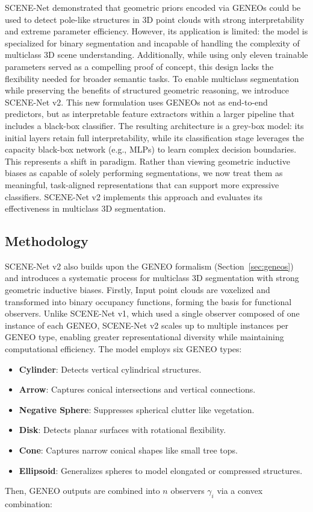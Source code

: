 SCENE-Net demonstrated that geometric priors encoded via GENEOs could be used
to detect pole-like structures in 3D point clouds with strong interpretability
and extreme parameter efficiency. However, its application is limited: the
model is specialized for binary segmentation and incapable of handling the
complexity of multiclass 3D scene understanding. Additionally, while using only
eleven trainable parameters served as a compelling proof of concept, this
design lacks the flexibility needed for broader semantic tasks.
%
To enable multiclass segmentation while preserving the benefits of structured
geometric reasoning, we introduce SCENE-Net v2. This new formulation uses
GENEOs not as end-to-end predictors, but as interpretable feature extractors
within a larger pipeline that includes a black-box classifier. The resulting
architecture is a grey-box model: its initial layers retain full
interpretability, while its classification stage leverages the capacity
black-box network (e.g., MLPs) to learn complex decision boundaries.
%
This represents a shift in paradigm. Rather than viewing geometric inductive
biases as capable of solely performing segmentations, we now treat them as
meaningful, task-aligned representations that can support more expressive
classifiers. SCENE-Net v2 implements this approach and evaluates its
effectiveness in multiclass 3D segmentation.

\subsection{Methodology}

SCENE-Net v2 also builds upon the GENEO formalism (Section~\ref{sec:geneos})
and introduces a systematic process for multiclass 3D segmentation with strong
geometric inductive biases.
%
Firstly, Input point clouds are voxelized and transformed into binary occupancy
functions, forming the basis for functional observers.
%
Unlike SCENE-Net v1, which used a single observer composed of one instance of
each GENEO, SCENE-Net v2 scales up to multiple instances per GENEO type,
enabling greater representational diversity while maintaining computational
efficiency. The model employs six GENEO types:
\begin{itemize}
      \item \textbf{Cylinder}: Detects vertical cylindrical structures.
      \item \textbf{Arrow}: Captures conical intersections and vertical connections.
      \item \textbf{Negative Sphere}: Suppresses spherical clutter like vegetation.
      \item \textbf{Disk}: Detects planar surfaces with rotational flexibility.
      \item \textbf{Cone}: Captures narrow conical shapes like small tree tops.
      \item \textbf{Ellipsoid}: Generalizes spheres to model elongated or compressed structures.
\end{itemize}
%
Then, GENEO outputs are combined into $n$ observers $\gamma_i$ via a convex
combination:

